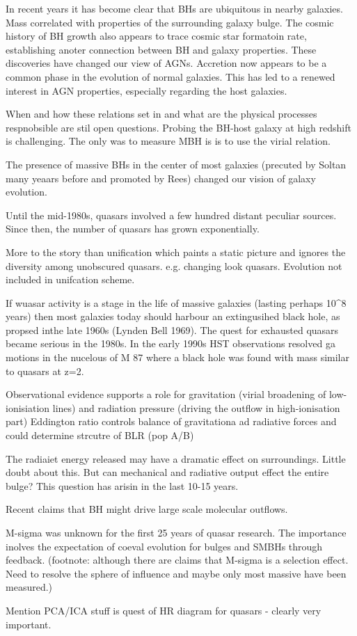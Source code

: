 In recent years it has become clear that BHs are ubiquitous in nearby galaxies. 
Mass correlated with properties of the surrounding galaxy bulge. 
The cosmic history of BH growth also appears to trace cosmic star formatoin rate, establishing anoter connection between BH and galaxy properties. 
These discoveries have changed our view of AGNs.
Accretion now appears to be a common phase in the evolution of normal galaxies. 
This has led to a renewed interest in AGN properties, especially regarding the host galaxies. 

When and how these relations set in and what are the physical processes respnobsible are stil  open questions. 
Probing the BH-host galaxy at high redshift is challenging. 
The only was to measure MBH is is to use the virial relation. 

The presence of massive BHs in the center of most galaxies (precuted by Soltan many yeaars before and promoted by Rees) changed our vision of galaxy evolution. 

Until the mid-1980s, quasars involved a few hundred distant peculiar sources.
Since then, the number of quasars has grown exponentially.

More to the story than unification which paints a static picture and ignores the diversity among unobscured quasars. e.g. changing look quasars. Evolution not included in unifcation scheme. 


If wuasar activity is a stage in the life of massive galaxies (lasting perhaps 10^8 years) then most galaxies today should harbour an extingusihed black hole, as propsed inthe late 1960s (Lynden Bell 1969). The quest for exhausted quasars became serious in the 1980s. In the early 1990s HST observations resolved ga motions in the nucelous of M 87 where a black hole was found with mass similar to quasars at z=2. 

Observational evidence supports a role for gravitation (virial broadening of low-ionisiation lines) and radiation pressure (driving the outflow in high-ionisation part) Eddington ratio controls balance of gravitationa ad radiative forces and could determine strcutre of BLR (pop A/B)

The radiaiet energy released may have a dramatic effect on surroundings. Little doubt about this. But can mechanical and radiative output effect the entire bulge? This question has arisin in the last 10-15 years. 

Recent claims that BH might drive large scale molecular outflows. 

M-sigma was unknown for the first 25 years of quasar research. The importance inolves the expectation of coeval evolution for bulges and SMBHs through feedback. (footnote: although there are claims that M-sigma is a selection effect. Need to resolve the sphere of influence and maybe only most massive have been measured.)

Mention PCA/ICA stuff is quest of HR diagram for quasars - clearly very important. 